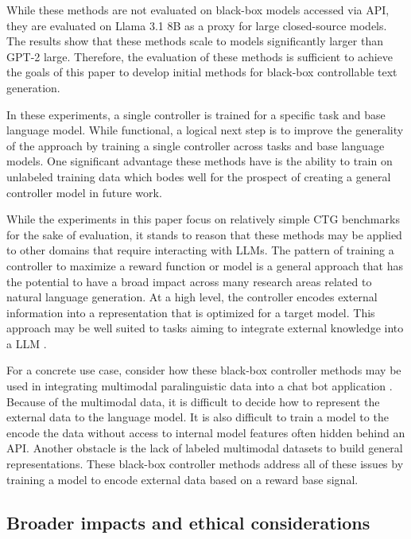\documentclass[phd,electronic,oneside,twosidetoc,letterpaper,chaptercenter,parttop,lof]{byumsphd}
\begin{document}
While these methods are not evaluated on black-box models accessed via API, they are evaluated on Llama 3.1 8B as a proxy for large closed-source models.
The results show that these methods scale to models significantly larger than GPT-2 large.
Therefore, the evaluation of these methods is sufficient to achieve the goals of this paper to develop initial methods for black-box controllable text generation.

In these experiments, a single controller is trained for a specific task and base language model.
While functional, a logical next step is to improve the generality of the approach by training a single controller across tasks and base language models. 
One significant advantage these methods have is the ability to train on unlabeled training data which bodes well for the prospect of creating a general controller model in future work.

While the experiments in this paper focus on relatively simple CTG benchmarks for the sake of evaluation, it stands to reason that these methods may be applied to other domains that require interacting with LLMs. 
The pattern of training a controller to maximize a reward function or model is a general approach that has the potential to have a broad impact across many research areas related to natural language generation.
At a high level, the controller encodes external information into a representation that is optimized for a target model.  This approach may be well suited to tasks aiming to integrate external knowledge into a LLM \citep{liu2019kalm, peters2019knowbert, wang2021kepler, morain2022symbolic}.

For a concrete use case, consider how these black-box controller methods may be used in integrating multimodal paralinguistic data into a chat bot application \cite{rumi}.
Because of the multimodal data, it is difficult to decide how to represent the external data to the language model.
It is also difficult to train a model to the encode the data without access to internal model features often hidden behind an API.
Another obstacle is the lack of labeled multimodal datasets to build general representations.
These black-box controller methods address all of these issues by training a model to encode external data based on a reward base signal.

\subsection{Broader impacts and ethical considerations}
\end{document}
